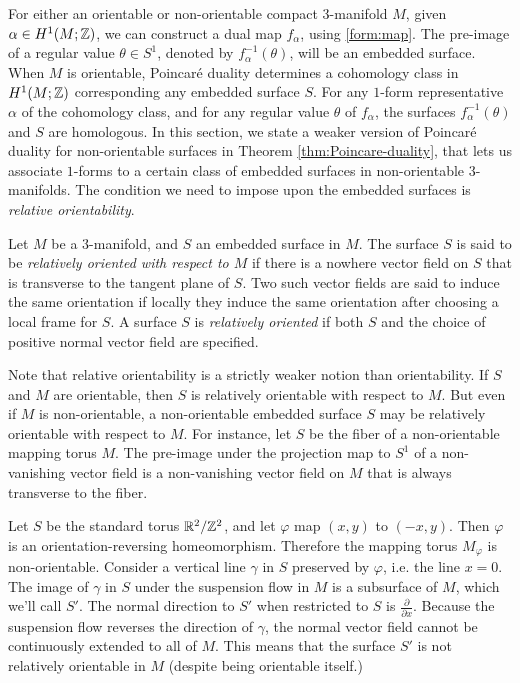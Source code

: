 For either an orientable or non-orientable compact 3-manifold $M$, given $\alpha\in H^1(M; \mathbb{Z})$, we can construct a dual map $f_\alpha$, using \eqref{form:map}.
The pre-image of a regular value $\theta \in S^1$, denoted by $f_{\alpha}^{-1}(\theta)$, will be an embedded surface.
When $M$ is orientable, Poincar\'e duality determines a cohomology class in $H^1(M; \mathbb{Z})$ corresponding any embedded surface $S$.
For any $1$-form representative $\alpha$ of the cohomology class, and for any regular value $\theta$ of $f_{\alpha}$, the surfaces $f_{\alpha}^{-1}(\theta)$ and $S$ are homologous.
In this section, we state a weaker version of Poincar\'e duality for non-orientable surfaces in Theorem \ref{thm:Poincare-duality}, that lets us associate $1$-forms to a certain class of embedded surfaces in non-orientable $3$-manifolds.
The condition we need to impose upon the embedded surfaces is \emph{relative orientability}.

\begin{defn}
  Let $M$ be a $3$-manifold, and $S$ an embedded surface in $M$.
  The surface $S$ is said to be \emph{relatively oriented with respect to $M$} if there is a nowhere vector field on $S$ that is transverse to the tangent plane of $S$.
  Two such vector fields are said to induce the same orientation if locally they induce the same orientation after choosing a local frame for $S$.
  A surface $S$ is \emph{relatively oriented} if both $S$ and the choice of positive normal vector field are specified.
\end{defn}
Note that relative orientability is a strictly weaker notion than orientability.
If $S$ and $M$ are orientable, then $S$ is relatively orientable with respect to $M$.
But even if $M$ is non-orientable, a non-orientable embedded surface $S$ may be relatively orientable with respect to $M$.
For instance, let $S$ be the fiber of a non-orientable mapping torus $M$.
The pre-image under the projection map to $S^1$ of a non-vanishing vector field is a non-vanishing vector field on $M$ that is always transverse to the fiber.

\begin{example}
  Let $S$ be the standard torus $\mathbb{R}^2/\mathbb{Z}^2$, and let $\varphi$ map $(x,y)$ to $(-x, y)$.
  Then $\varphi$ is an orientation-reversing homeomorphism.
  Therefore the mapping torus $M_\varphi$ is non-orientable.
  Consider a vertical line $\gamma$ in $S$ preserved by $\varphi$, i.e. the line
  $x = 0$.
  The image of $\gamma$ in $S$ under the suspension flow in $M$ is a subsurface of $M$, which we'll call $S'$.
  The normal direction to $S'$ when restricted to $S$ is $\frac{\partial}{\partial x}$.
  Because the suspension flow reverses the direction of $\gamma$, the normal vector field cannot be continuously extended to all of $M$.
  This means that the surface $S'$ is not relatively orientable in $M$ (despite being orientable itself.)
\end{example}

